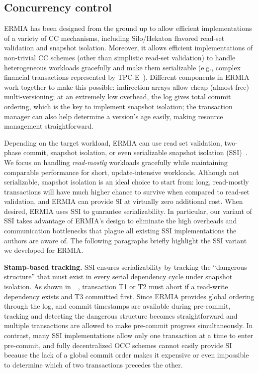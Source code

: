 \subsection{Concurrency control}

ERMIA has been designed from the ground up to allow efficient implementations of a variety of CC mechanisms, including Silo/Hekaton flavored read-set validation and snapshot isolation. Moreover, it allows efficient implementations of non-trivial CC schemes (other than simplistic read-set validation) to handle heterogeneous workloads gracefully and make them serializable (e.g., complex financial transactions represented by TPC-E~\cite{TPCE}). Different components in ERMIA work together to make this possible: indirection arrays allow cheap (almost free) multi-versioning; at an extremely low overhead, the log gives total commit ordering, which is the key to implement snapshot isolation; the transaction manager can also help determine a version's age easily, making resource management straightforward.

Depending on the target workload, ERMIA can use read set validation, two-phase commit, snapshot isolation, or even serializable snapshot isolation (SSI)~\cite{Cahill08RF}. We focus on handling \textit{read-mostly} workloads gracefully while maintaining comparable performance for short, update-intensive workloads. Although not serializable, snapshot isolation is an ideal choice to start from: long, read-mostly transactions will have much higher chance to survive when compared to read-set validation, and ERMIA can provide SI at virtually zero additional cost. When desired, ERMIA uses SSI to guarantee serializability. In particular, our variant of SSI takes advantage of ERMIA's design to eliminate the high overheads and communication bottlenecks that plague all existing SSI implementations the authors are aware of. The following paragraphs briefly highlight the SSI variant we developed for ERMIA.


{\bf Stamp-based tracking.}
SSI ensures serializability by tracking the ``dangerous structure'' that must exist in every serial dependency cycle under snapshot isolation. As shown in~~\cite{Cahill08RF}, transaction T1 or T2 must abort if a read-write dependency exists and T3 committed first. Since ERMIA provides global ordering through the log, and commit timestamps are available during pre-commit, tracking and detecting the dangerous structure becomes straightforward and multiple transactions are allowed to make pre-commit progress simultaneously. In contrast, many SSI implementations allow only one transaction at a time to enter pre-commit, and fully decentralized OCC schemes cannot easily provide SI because the lack of a global commit order makes it expensive or even impossible to determine which of two transactions precedes the other.

